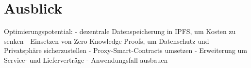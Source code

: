 \chapter{Ausblick}
\label{ch:perspective}
Optimierungspotential:
 - dezentrale Datenspeicherung in IPFS, um Kosten zu senken
 - Einsetzen von Zero-Knowledge Proofs, um Datenschutz und Privatsphäre sicherzustellen
 - Proxy-Smart-Contracts umsetzen
 - Erweiterung um Service- und Lieferverträge
 - Anwendungsfall ausbauen
